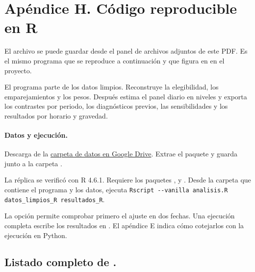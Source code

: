 \documentclass[11pt,letterpaper]{article}
\begin{document}
\clearpage

\section*{Apéndice H. Código reproducible en R}

El archivo  se puede guardar desde el panel de archivos adjuntos de este PDF. Es el mismo programa que se reproduce a continuación y que figura en  en el proyecto.\par

El programa parte de los datos limpios. Reconstruye la elegibilidad, los emparejamientos y los pesos. Después estima el panel diario en niveles y exporta los contrastes por periodo, los diagnósticos previos, las sensibilidades y los resultados por horario y gravedad.\par

\paragraph{Datos y ejecución.}

Descarga  de la \href{\detokenize{https://drive.google.com/drive/folders/19fPf9UVt5Vdm-h2LiM2sBdD9erg0qItu?usp=sharing}}{carpeta de datos en Google Drive}. Extrae el paquete y guarda  junto a la carpeta .\par

La réplica se verificó con R 4.6.1. Requiere los paquetes ,  y . Desde la carpeta que contiene el programa y los datos, ejecuta \texttt{Rscript -{}-vanilla analisis.R datos\_limpios\_R resultados\_R}.\par

La opción  permite comprobar primero el ajuste en dos fechas. Una ejecución completa escribe los resultados en . El apéndice E indica cómo cotejarlos con la ejecución en Python.\par

\subsection*{Listado completo de .}



\end{document}

